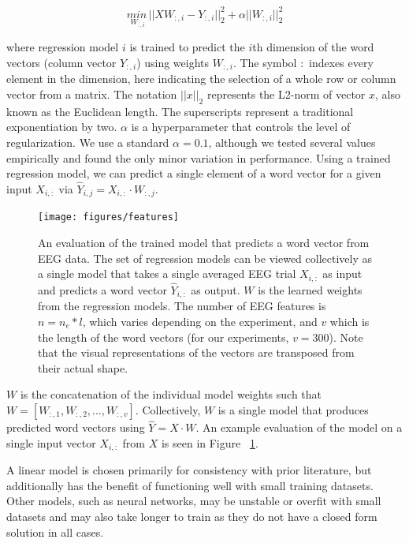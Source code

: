 \begin{equation}
  \underset{W_{:,i}}{min\,} {|| X W_{:, i} - Y_{:, i}||_2^2 + 
  \alpha ||W_{:, i}||_2^2}
  \label{eq:ridge}
\end{equation}

\noindent where regression model $i$ is trained to predict the $i$th dimension 
of the word vectors (column vector $Y_{:,i}$) using weights $W_{:,i}$. The 
symbol $:$ indexes every element in the dimension, here indicating the 
selection of a whole row or column vector from a matrix. The notation 
$||x||_2$ represents the L2-norm of vector $x$, also known as the Euclidean 
length. The superscripts represent a traditional exponentiation by two.  
$\alpha$ is a hyperparameter that controls the level of regularization.  We use 
a standard $\alpha = 0.1$, although we tested several values empirically and 
found the only minor variation in performance.  Using a trained regression 
model, we can predict a single element of a word vector for a given input 
$X_{i,:}$ via $\hat{Y}_{i,j} = X_{i, :} \cdot W_{:,j}$.

\begin{figure}[ht]
  \centering
  \texttt{[image: figures/features]}
  \caption[Evaluation of the Trained Model]{
    An evaluation of the trained model that predicts a word vector from EEG 
    data.  The set of regression models can be viewed collectively as a single 
    model that takes a single averaged EEG trial $X_{i,:}$ as input and 
    predicts a word vector $\hat{Y}_{i,:}$ as output. $W$ is the learned 
    weights from the regression models. The number of EEG features is $n = n_e 
    * l$, which varies depending on the experiment, and $v$ which is the length 
    of the word vectors (for our experiments, $v=300$). Note that the visual 
    representations of the vectors are transposed from their actual shape.
  }
  \label{fig:features}
\end{figure}

\sloppy $W$ is the concatenation of the individual model weights such that $W = 
[ W_{:,1}, W_{:,2}, ..., W_{:,v} ]$. Collectively, $W$ is a single model that 
produces predicted word vectors using $\hat{Y} = X \cdot W$. An example 
evaluation of the model on a single input vector $X_{i,:}$ from $X$ is seen in 
Figure ~\ref{fig:features}.

A linear model is chosen primarily for consistency with prior literature, but 
additionally has the benefit of functioning well with small training datasets.
Other models, such as neural networks, may be unstable or overfit with small 
datasets and may also take longer to train as they do not have a closed form 
solution in all cases.

